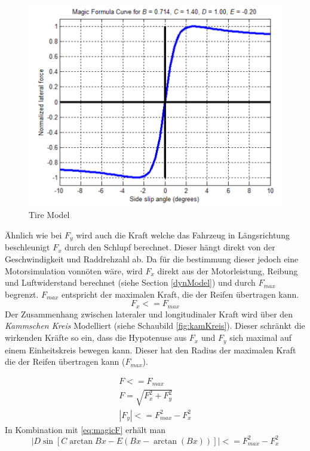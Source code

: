\documentclass{like}
\begin{document}
 
 \begin{figure}[ht!]
 	\includegraphics[width=350pt]{Abbildungen/pacejka.png}
 	\caption{Tire Model}
 	\label{fig:pacejka}
 \end{figure}
 
Ähnlich wie bei \(F_y\) wird auch die Kraft welche das Fahrzeug in Längsrichtung beschleunigt \(F_x\) durch den Schlupf berechnet. Dieser hängt direkt von der Geschwindigkeit und Raddrehzahl ab. 
Da für die bestimmung dieser jedoch eine Motorsimulation vonnöten wäre, wird \(F_x\) direkt aus der Motorleistung, Reibung und Luftwiderstand berechnet (siehe Section \ref{dynModel}) und durch \(F_{max}\) begrenzt. \(F_{max}\) entspricht der maximalen Kraft, die der Reifen übertragen kann.\\
\begin{equation}
 	F_x <= F_{max}
\end{equation}
Der Zusammenhang zwischen lateraler und longitudinaler Kraft wird über den \textit{Kammschen Kreis} Modelliert (siehe Schaubild \ref{fig:kamKreis}). Dieser schränkt die wirkenden Kräfte so ein, dass die Hypotenuse aus \(F_x\) und \(F_y\) sich maximal auf einem Einheitskreis bewegen kann. Dieser hat den Radius der maximalen Kraft die der Reifen übertragen kann (\(F_{max}\)).

\begin{eqnarray}
	F <= F_{max} \\
	F = \sqrt{F_x^2 + F_y^2}  \\
	|F_y| <= F_{max}^2 - F_x^2
\end{eqnarray}
In Kombination mit \ref{eq:magicF} erhält man
 \begin{equation}
	|D\sin[C\arctan{Bx - E(Bx - \arctan(Bx))}]| <= F_{max}^2 - F_x^2
 \end{equation}
\end{document}
